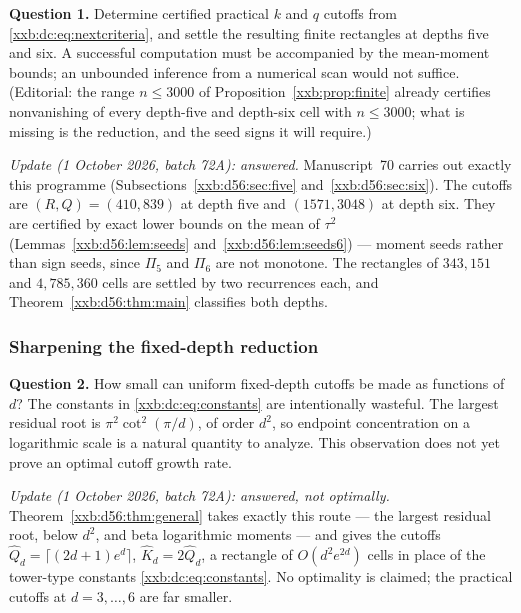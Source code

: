 \documentclass[11pt,a4paper]{article}
\numberwithin{equation}{section}
\theoremstyle{definition}
\theoremstyle{remark}
\theoremstyle{plain}
\begin{document}
\textbf{Question 1.}  Determine certified practical $k$ and $q$ cutoffs
from \eqref{xxb:dc:eq:nextcriteria}, and settle the resulting finite rectangles
at depths five and six.  A successful computation must be accompanied by
the mean-moment bounds; an unbounded inference from a numerical scan
would not suffice.  (Editorial: the range $n\le3000$ of
Proposition~\ref{xxb:prop:finite} already certifies nonvanishing of every
depth-five and depth-six cell with $n\le3000$; what is missing is the
reduction, and the seed signs it will require.)

\emph{Update (1 October 2026, batch 72A): answered.}  Manuscript~70 carries out
exactly this programme (Subsections~\ref{xxb:d56:sec:five}
and~\ref{xxb:d56:sec:six}).  The cutoffs are $(R,Q)=(410,839)$ at depth five and
$(1571,3048)$ at depth six.  They are certified by exact lower bounds on the
mean of $\tau^2$ (Lemmas~\ref{xxb:d56:lem:seeds} and~\ref{xxb:d56:lem:seeds6})
--- moment seeds rather than sign seeds, since $\Pi_5$ and $\Pi_6$ are not
monotone.  The rectangles of $343{,}151$ and $4{,}785{,}360$ cells are settled
by two recurrences each, and Theorem~\ref{xxb:d56:thm:main} classifies both
depths.

\subsubsection{Sharpening the fixed-depth reduction}
\textbf{Question 2.}  How small can uniform fixed-depth cutoffs be made as
functions of $d$?  The constants in \eqref{xxb:dc:eq:constants} are
intentionally wasteful.  The largest residual root is $\pi^2\cot^2(\pi/d)$, of
order $d^2$, so endpoint concentration on a logarithmic scale is a natural
quantity to analyze.  This observation does not yet prove an optimal
cutoff growth rate.

\emph{Update (1 October 2026, batch 72A): answered, not optimally.}
Theorem~\ref{xxb:d56:thm:general} takes exactly this route --- the largest
residual root, below $d^2$, and beta logarithmic moments --- and gives the
cutoffs $\widehat Q_d=\lceil(2d+1)e^d\rceil$, $\widehat K_d=2\widehat Q_d$, a
rectangle of $O(d^2e^{2d})$ cells in place of the tower-type constants
\eqref{xxb:dc:eq:constants}.  No optimality is claimed; the practical cutoffs
at $d=3,\ldots,6$ are far smaller.
\end{document}
